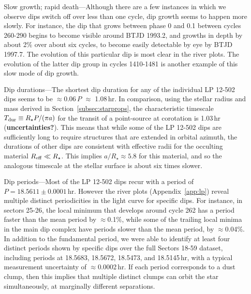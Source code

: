 \documentclass[11pt,twocolumn,tighten]{aastex63}
\begin{document}
{\sc Slow growth; rapid death}---Although there are a few instances in
which we observe dips switch off over less than one cycle, dip
growth seems to happen more slowly.  For instance, the dip that grows
between phase 0 and 0.1 between cycles 260-290 begins to become
visible around BTJD 1993.2, and growths in depth by about 2\% over
about six cycles, to become easily detectable by eye by BTJD 1997.7.
The evolution of this particular dip is most clear in the river plots.
The evolution of the latter dip group in cycles 1410-1481 is another
example of this slow mode of dip growth.


{\sc Dip durations}---The shortest dip duration for any of the
individual LP 12-502 dips seems to be $\approx$0.06\,$P$ $\approx$
1.08\,hr.  In comparison, using the stellar radius and mass derived in
Section~\ref{subsec:starprops}, the characteristic timescale $T_{\rm
dur} \equiv R_\star P / (\pi a)$ for the transit of a point-source at
corotation is 1.03\,hr ({\bf uncertainties?}).  This means that while
some of the LP 12-502 dips are sufficiently long to require structures
that are extended in orbital azimuth, the durations of other dips are
consistent with effective radii for the occulting material $R_{\rm
eff} \ll R_\star$.  This implies $a/R_\star \approx 5.8$ for this
material, and so the analogous timescale at the stellar surface is
about six times slower.

{\sc Dip periods}---Most of the LP 12-502 dips recur with a period of
$P=18.5611 \pm 0.0001$\,hr.  However the river plots
(Appendix~\ref{app:lp}) reveal multiple distinct periodicities in the
light curve for specific dips.  For instance, in sectors 25-26, the
local minimum that develops around cycle 262 has a period faster than
the mean period by $\approx$0.1\%, while some of the trailing local
minima in the main dip complex have periods slower than the mean
period, by $\approx$0.04\%.  In addition to the fundamental period, we
were able to identify at least four distinct periods shown by specific
dips over the full Sectors 18-59 dataset, including periods at
18.5683, 18.5672, 18.5473, and 18.5145\,hr, with a typical measurement
uncertainty of $\approx$0.0002\,hr.  If each period corresponds to a
dust clump, then this implies that multiple distinct clumps can orbit
the star simultaneously, at marginally different separations.
\end{document}
